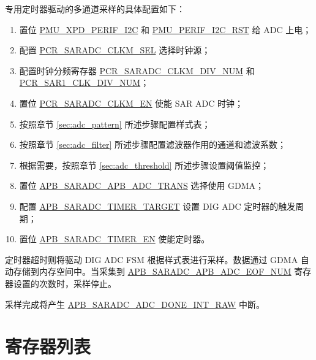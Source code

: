 \documentclass[main\_\_CN.tex]{subfiles}
\begin{document}
专用定时器驱动的多通道采样的具体配置如下：
\begin{enumerate}
    \item 置位 \hyperref[fielddesc:PMUXPDPERIFI2C]{PMU\_XPD\_PERIF\_I2C} 和 \hyperref[fielddesc:PMUPERIFI2CRST]{PMU\_PERIF\_I2C\_RST} 给 ADC 上电；
    \item 配置 \hyperref[fielddesc:PCRSARADCCLKMSEL]{PCR\_SARADC\_CLKM\_SEL} 选择时钟源；
    \item 配置时钟分频寄存器 \hyperref[fielddesc:PCRSARADCCLKMDIVNUM]{PCR\_SARADC\_CLKM\_DIV\_NUM} 和 \hyperref[fielddesc:PCRSAR1CLKDIVNUM]{PCR\_SAR1\_CLK\_DIV\_NUM}；
    \item 置位 \hyperref[fielddesc:PCRSARADCCLKMEN]{PCR\_SARADC\_CLKM\_EN} 使能 SAR ADC 时钟；    
    \item 按照章节 \ref{sec:adc_pattern} \textit{} 所述步骤配置样式表；
    \item 按照章节 \ref{sec:adc_filter} \textit{} 所述步骤配置滤波器作用的通道和滤波系数；
    \item 根据需要，按照章节 \ref{sec:adc_threshold} \textit{} 所述步骤设置阈值监控；
    \item 置位 \hyperref[fielddesc:APBSARADCAPBADCTRANS]{APB\_SARADC\_APB\_ADC\_TRANS} 选择使用 GDMA；
    \item 配置 \hyperref[fielddesc:APBSARADCTIMERTARGET]{APB\_SARADC\_TIMER\_TARGET} 设置 DIG ADC 定时器的触发周期；
    \item 置位 \hyperref[fielddesc:APBSARADCTIMEREN]{APB\_SARADC\_TIMER\_EN} 使能定时器。    
\end{enumerate}

定时器超时则将驱动 DIG ADC FSM 根据样式表进行采样。数据通过 GDMA 自动存储到内存空间中。当采集到 \hyperref[fielddesc:APBSARADCAPBADCEOFNUM]{APB\_SARADC\_APB\_ADC\_EOF\_NUM} 寄存器设置的次数时，采样停止。


采样完成将产生 \hyperref[fielddesc:APBSARADCDONEINTRAW]{APB\_SARADC\_ADC\_DONE\_INT\_RAW} 中断。





\newpage
\hypertarget{adc-reg-summ}{}
\section{寄存器列表}
\label{sec:adc-reg-summ}
\end{document}
